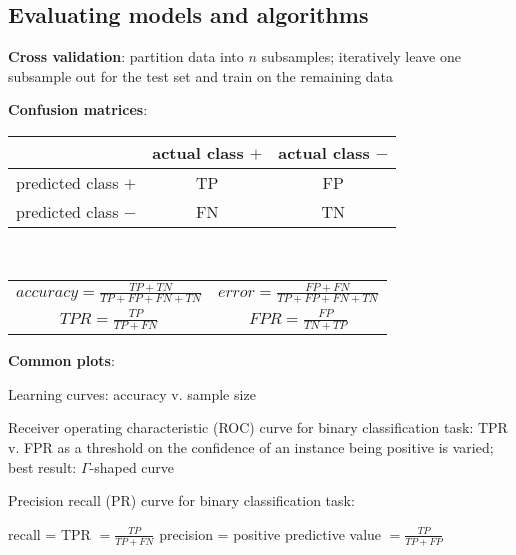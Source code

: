 \documentclass[letterpaper,fontsize=5pt]{scrartcl}
\renewenvironment{enumerate}[1]{\begin{compactenum}#1}{\end{compactenum}}
\theoremstyle{definition}
\begin{document}
\begin{multicols}{2}
	
\section{Evaluating models and algorithms}
\begin{enumerate}
	\item \textbf{Cross validation}: partition data into $n$ subsamples; iteratively leave one subsample out for the test set and train on the remaining data
	\item \textbf{Confusion matrices}:
	\begin{center}
		\begin{tabular}{ c | c | c | }
			& actual class $+$ & actual class $-$ \\ 
			\hline
			predicted class $+$ & TP & FP \\ 
			\hline 
			predicted class $-$ & FN & TN \\
			\hline
		\end{tabular}\\
	\end{center}
	\begin{center}
		\begin{tabular}{ c  c }
			$accuracy = \frac{TP+TN}{TP+FP+FN+TN}$ & $error = \frac{FP+FN}{TP+FP+FN+TN}$\\ $TPR = \frac{TP}{TP+FN}$ & $FPR = \frac{FP}{TN+TP}$ 
		\end{tabular}
	\end{center}
	\item \textbf{Common plots}:
	\begin{enumerate}
		\item Learning curves: accuracy v. sample size
		\item Receiver operating characteristic (ROC) curve for binary classification task: TPR v. FPR as a threshold on the confidence of an instance being positive is varied; best result: $\Gamma$-shaped curve
		\item Precision recall (PR) curve for binary classification task:
		\begin{enumerate}
			\item recall = TPR $= \frac{TP}{TP+FN}$ \hfill precision = positive predictive value $= \frac{TP}{TP+FP}$

\end{enumerate}
\end{enumerate}
\end{enumerate}
\end{multicols}
\end{document}
